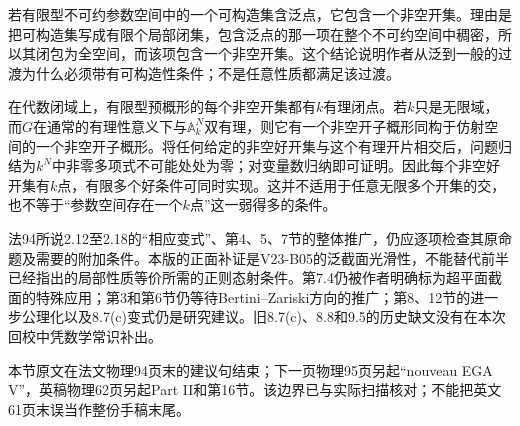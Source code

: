 若有限型不可约参数空间中的一个可构造集含泛点，它包含一个非空开集。理由是把可构造集写成有限个局部闭集，包含泛点的那一项在整个不可约空间中稠密，所以其闭包为全空间，而该项包含一个非空开集。这个结论说明作者从泛到一般的过渡为什么必须带有可构造性条件；不是任意性质都满足该过渡。

在代数闭域上，有限型预概形的每个非空开集都有$k$有理闭点。若$k$只是无限域，而$G$在通常的有理性意义下与$\mathbb A^N_k$双有理，则它有一个非空开子概形同构于仿射空间的一个非空开子概形。将任何给定的非空好开集与这个有理开片相交后，问题归结为$k^N$中非零多项式不可能处处为零；对变量数归纳即可证明。因此每个非空好开集有$k$点，有限多个好条件可同时实现。这并不适用于任意无限多个开集的交，也不等于“参数空间存在一个$k$点”这一弱得多的条件。

法94所说2.12至2.18的“相应变式”、第4、5、7节的整体推广，仍应逐项检查其原命题及需要的附加条件。本版的正面补证是V23-B05的泛截面光滑性，不能替代前半已经指出的局部性质等价所需的正则态射条件。第7.4仍被作者明确标为超平面截面的特殊应用；第3和第6节仍等待Bertini--Zariski方向的推广；第8、12节的进一步公理化以及8.7(c)变式仍是研究建议。旧8.7(c)、8.8和9.5的历史缺文没有在本次回校中凭数学常识补出。

本节原文在法文物理94页末的建议句结束；下一页物理95页另起“nouveau EGA V”，英稿物理62页另起Part II和第16节。该边界已与实际扫描核对；不能把英文61页末误当作整份手稿末尾。
